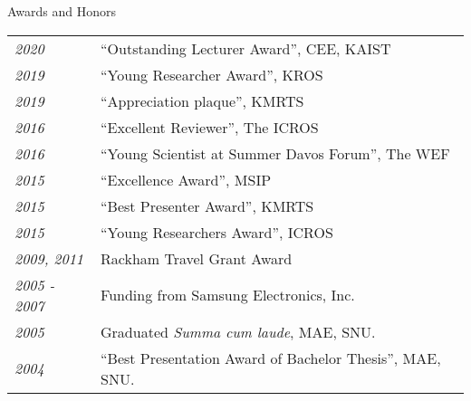 \begin{rSection}{Awards and Honors}
    \begin{tabular}{ @{} >{\itshape}l @{\hspace{6ex}} l }
    2020        & ``Outstanding Lecturer Award'', CEE, KAIST\\  
    2019        & ``Young Researcher Award'', \ac{KROS}\\
    2019        & ``Appreciation plaque'', \ac{KMRTS}\\
    2016        & ``Excellent Reviewer'', The \ac{ICROS} \\
    2016        & ``Young Scientist at Summer Davos Forum'', The \ac{WEF} \\
    2015        & ``Excellence Award'', \ac{MSIP} \\
    2015        & ``Best Presenter Award'', \ac{KMRTS}\\
    2015        & ``Young Researchers Award'', \ac{ICROS} \\
    2009, 2011  & Rackham Travel Grant Award\\
    2005 - 2007 & Funding from Samsung Electronics, Inc. \\
    2005        & Graduated {\em Summa cum laude}, MAE, SNU. \\
    2004        & ``Best Presentation Award of Bachelor Thesis'', MAE, SNU. \\
    \end{tabular}
\end{rSection}
